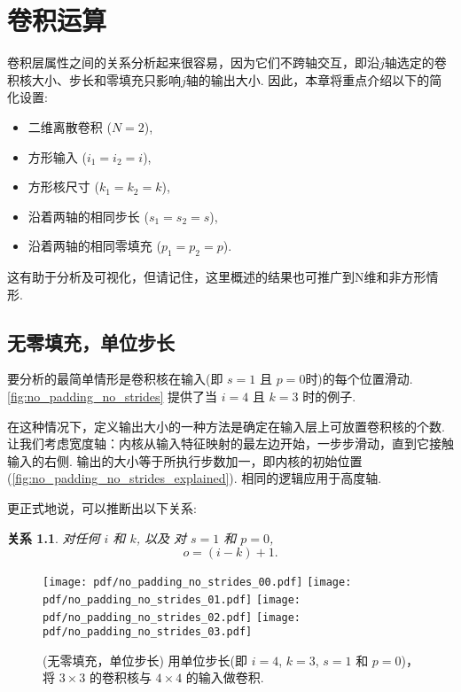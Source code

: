 \documentclass[notitlepage]{ctexrep}
\newtheorem{relationship}{关系}
\begin{document}
\chapter{卷积运算}

卷积层属性之间的关系分析起来很容易，因为它们不跨轴交互，即沿$j$轴选定的卷积核大小、步长和零填充只影响$j$轴的输出大小. 因此，本章将重点介绍以下的简化设置:

\begin{itemize}
    \item 二维离散卷积 ($N = 2$),
    \item 方形输入 ($i_1 = i_2 = i$),
    \item 方形核尺寸 ($k_1 = k_2 = k$),
    \item 沿着两轴的相同步长 ($s_1 = s_2 = s$),
    \item 沿着两轴的相同零填充 ($p_1 = p_2 = p$).
\end{itemize}

这有助于分析及可视化，但请记住，这里概述的结果也可推广到N维和非方形情形.

\section{无零填充，单位步长}

要分析的最简单情形是卷积核在输入(即 $s = 1$ 且 $p = 0$时)的每个位置滑动.
\autoref{fig:no_padding_no_strides} 提供了当 $i = 4$ 且 $k =
3$ 时的例子.

在这种情况下，定义输出大小的一种方法是确定在输入层上可放置卷积核的个数. 让我们考虑宽度轴：内核从输入特征映射的最左边开始，一步步滑动，直到它接触输入的右侧. 输出的大小等于所执行步数加一，即内核的初始位置 (\autoref{fig:no_padding_no_strides_explained}). 相同的逻辑应用于高度轴.

更正式地说，可以推断出以下关系:

\begin{relationship}\label{rel:no_padding_no_strides}
对任何 $i$ 和 $k$, 以及 对 $s = 1$ 和 $p = 0$,
\begin{equation*}
    o = (i - k) + 1.
\end{equation*}
\end{relationship}

\begin{figure}[p]
    \centering
    \texttt{[image: pdf/no\_padding\_no\_strides\_00.pdf]}
    \texttt{[image: pdf/no\_padding\_no\_strides\_01.pdf]}
    \texttt{[image: pdf/no\_padding\_no\_strides\_02.pdf]}
    \texttt{[image: pdf/no\_padding\_no\_strides\_03.pdf]}
    \caption{\label{fig:no_padding_no_strides} (无零填充，单位步长)
    用单位步长(即 $i = 4$, $k = 3$, $s = 1$ 和 $p = 0$)，将 $3 \times 3$ 的卷积核与 $4 \times 4$ 的输入做卷积.}
\end{figure}
\end{document}
